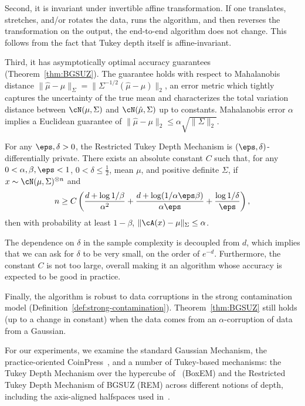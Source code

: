 Second, it is invariant under invertible affine transformation. If one translates, stretches, and/or rotates the data, runs the algorithm, and then reverses the transformation on the output, the end-to-end algorithm does not change. 
This follows from the fact that Tukey depth itself is affine-invariant.

Third, it has asymptotically optimal accuracy guarantees (Theorem~\ref{thm:BGSUZ}). 
The guarantee holds with respect to Mahalanobis distance $\|\hat{\mu}-\mu\|_\Sigma=\|\Sigma^{-1/2}(\hat{\mu}-\mu)\|_2$, an error metric which tightly captures the uncertainty of the true mean and characterizes the total variation distance between $\cN(\mu, \Sigma)$ and $\cN(\hat{\mu}, \Sigma)$ up to constants. 
Mahalanobis error $\alpha$ implies a Euclidean guarantee of $\|\hat\mu - \mu\|_2 \leq \alpha \sqrt{\|\Sigma\|_2}$. 
\begin{thm}\label{thm:BGSUZ}
    For any $\eps,\delta >0$, the Restricted Tukey Depth Mechanism is $(\eps, \delta)$-differentially private.
    There exists an absolute constant $C$ such that, for any $0<\alpha,\beta,\eps < 1$, $0<\delta\le \frac{1}{2}$, mean $\mu$, and positive definite $\Sigma$, if $x\sim \cN(\mu,\Sigma)^{\otimes n}$ and
    \begin{equation}
        n \ge C\left(\frac{d + \log 1/\beta}{\alpha^2} + \frac{d + \log(1/\alpha\eps \beta)}{\alpha\eps} +  \frac{\log 1/\delta}{\eps} \right),
    \end{equation}
    then with probability at least $1-\beta$, $\|\cA(x)-\mu\|_{\Sigma}\leq\alpha$.
\end{thm}
The dependence on $\delta$ in the sample complexity is decoupled from $d$, which implies that we can ask for $\delta$ to be very small, on the order of $e^{-d}$. 
Furthermore, the constant $C$ is not too large, overall making it an algorithm whose accuracy is expected to be good in practice.

Finally, the algorithm is robust to data corruptions in the strong contamination model (Definition~\ref{def:strong-contamination}).
Theorem~\ref{thm:BGSUZ} still holds (up to a change in constant) when the data comes from an $\alpha$-corruption of data from a Gaussian.

For our experiments, we examine the standard Gaussian Mechanism, the practice-oriented CoinPress~\cite{biswas2020coinpress}, and a number of Tukey-based mechanisms: the Tukey Depth Mechanism over the hypercube of~\cite{liu2021robust} (BoxEM) and the Restricted Tukey Depth Mechanism of BGSUZ (REM) across different notions of depth, including the axis-aligned halfspaces used in~\cite{amin2022easy}.

